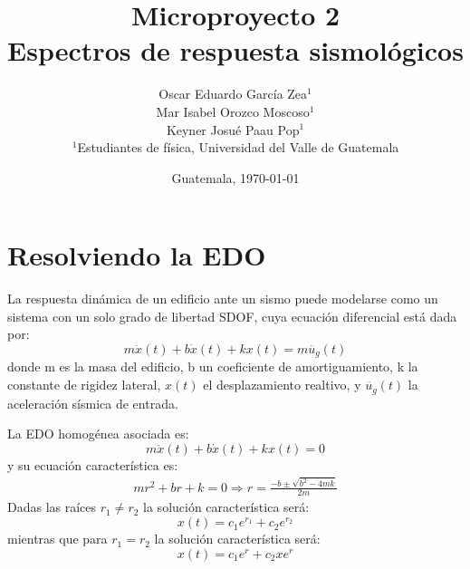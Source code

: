 \documentclass[12pt,letterpaper]{article}
\title{\textbf{Microproyecto 2}\\[0.5ex]Espectros de respuesta sismológicos}
\author{
  Oscar Eduardo García Zea$^{1}$\\
  Mar Isabel Orozco Moscoso$^{1}$\\
  Keyner Josué Paau Pop$^{1}$\\
  {\small $^{1}$Estudiantes de física, Universidad del Valle de Guatemala}
}
\date{Guatemala, \today}
\begin{document}
\thispagestyle{fancy}
\maketitle %

\section{Resolviendo la EDO}
La respuesta dinámica de un edificio ante un sismo puede modelarse como un sistema con un solo grado de libertad SDOF, cuya
ecuación diferencial está dada por:
\begin{equation*}
    m\ddot{x}(t) + b\dot{x}(t) + kx(t) = m\ddot{u_g}(t) 
\end{equation*}
donde m es la masa del edificio, b un coeficiente de amortiguamiento, k la constante de rigidez lateral, $x(t)$ el desplazamiento realtivo,
y $\ddot{u_g}(t)$ la aceleración sísmica de entrada.

La EDO homogénea asociada es:
\begin{equation*}
    m\ddot{x}(t) + b\dot{x}(t) + kx(t) = 0
\end{equation*}
y su ecuación característica es:
\begin{gather*}
    mr^2 + br + k = 0
    \Rightarrow r = \frac{-b\pm \sqrt{b^2-4mk}}{2m}
\end{gather*}
Dadas las raíces $r_1 \neq r_2$ la solución característica será:
\begin{equation*}
    x(t) = c_1e^{r_1}+c_2e^{r_2}
\end{equation*}
mientras que para $r_1 = r_2$ la solución característica será:
\begin{equation*}
x(t) = c_1e^{r}+c_2xe^{r}
\end{equation*}
\end{document}
